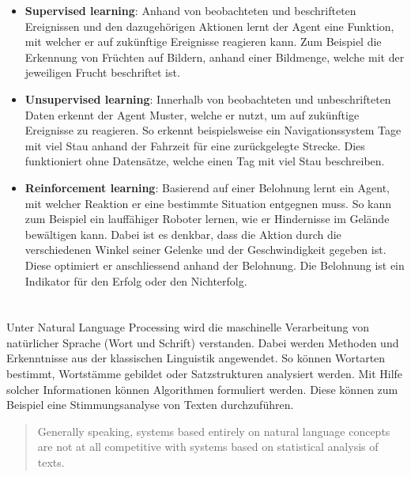 \begin{itemize}
    \item \textbf{Supervised learning}: Anhand von beobachteten und beschrifteten Ereignissen und den dazugehörigen Aktionen lernt der Agent eine Funktion, mit welcher er auf zukünftige Ereignisse reagieren kann. Zum Beispiel die Erkennung von Früchten auf Bildern, anhand einer Bildmenge, welche mit der jeweiligen Frucht beschriftet ist.
    \item \textbf{Unsupervised learning}: Innerhalb von beobachteten und unbeschrifteten Daten erkennt der Agent Muster, welche er nutzt, um auf zukünftige Ereignisse zu reagieren. So erkennt beispielsweise ein Navigationssystem Tage mit viel Stau anhand der Fahrzeit für eine zurückgelegte Strecke. Dies funktioniert ohne Datensätze, welche einen Tag mit viel Stau beschreiben.
    \item \textbf{Reinforcement learning}: Basierend auf einer Belohnung lernt ein Agent, mit welcher Reaktion er eine bestimmte Situation entgegnen muss. So kann zum Beispiel ein lauffähiger Roboter lernen, wie er Hindernisse im Gelände bewältigen kann. Dabei ist es denkbar, dass die Aktion durch die verschiedenen Winkel seiner Gelenke und der Geschwindigkeit gegeben ist. Diese optimiert er anschliessend anhand der Belohnung. Die Belohnung ist ein Indikator für den Erfolg oder den Nichterfolg.
\end{itemize}


\section{}\label{natural-language-processing}


Unter \gls{Natural Language Processing} wird die maschinelle Verarbeitung von natürlicher Sprache (Wort und Schrift) verstanden. Dabei werden Methoden und Erkenntnisse aus der klassischen \gls{Linguistik} angewendet. So können Wortarten bestimmt, Wortstämme gebildet oder Satzstrukturen analysiert werden. Mit Hilfe solcher Informationen können Algorithmen formuliert werden. Diese können zum Beispiel eine Stimmungsanalyse von Texten durchzuführen. 

\begin{quote}
Generally speaking, systems based entirely on natural language concepts are not at all competitive with systems based on statistical analysis of texts.\\\cite{kantor2001foundations}
\end{quote}

